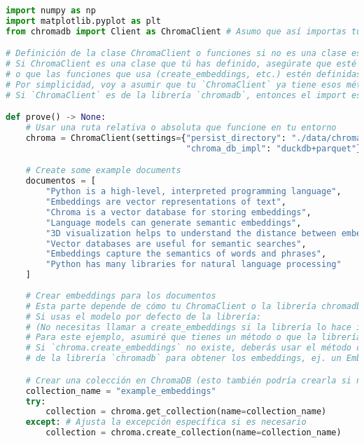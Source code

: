 \begin{lstlisting}[language=Python, caption={Script de Python para la prueba de concepto con ChromaDB.}, label={lst:chroma_prove_code}]
import numpy as np
import matplotlib.pyplot as plt
from chromadb import Client as ChromaClient # Asumo que así importas tu cliente

# Definición de la clase ChromaClient o funciones si no es una clase estándar
# Si ChromaClient es una clase que tú has definido, asegúrate que esté disponible
# o que las funciones que usa (create_embeddings, etc.) estén definidas.
# Por simplicidad, voy a asumir que tu `ChromaClient` ya tiene esos métodos.
# Si `ChromaClient` es de la librería `chromadb`, entonces el import es suficiente.

def prove() -> None:
    # Usar una ruta relativa o absoluta que funcione en tu entorno
    chroma = ChromaClient(settings={"persist_directory": "./data/chroma_prove_db",
                                    "chroma_db_impl": "duckdb+parquet"}) # Ejemplo de settings si es necesario

    # Create some example documents
    documentos = [
        "Python is a high-level, interpreted programming language",
        "Embeddings are vector representations of text",
        "Chroma is a vector database for storing embeddings",
        "Language models can generate semantic embeddings",
        "3D visualization helps to understand the distance between embeddings",
        "Vector databases are useful for semantic searches",
        "Embeddings capture the semantics of words and phrases",
        "Python has many libraries for natural language processing"
    ]
    
    # Crear embeddings para los documentos
    # Esta parte depende de cómo tu ChromaClient o la librería chromadb genera embeddings.
    # Si usas el modelo por defecto de la librería:
    # (No necesitas llamar a create_embeddings si la librería lo hace internamente al añadir)
    # Para este ejemplo, asumiré que tienes un método o que la librería lo maneja.
    # Si `chroma.create_embeddings` no existe, deberás usar el método correcto
    # de la librería `chromadb` para obtener los embeddings, ej. un EmbeddingFunction.

    # Crear una colección en ChromaDB (esto también podría crearla si no existe al añadir documentos)
    collection_name = "example_embeddings"
    try:
        collection = chroma.get_collection(name=collection_name)
    except: # Ajusta la excepción específica si es necesario
        collection = chroma.create_collection(name=collection_name)
    

\end{lstlisting}
